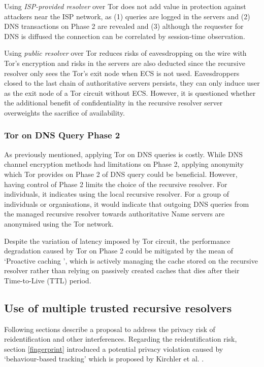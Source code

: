 Using \textit{ISP-provided resolver} over Tor does not add value in protection against attackers near the ISP network, as (1) queries are logged in the servers and (2) DNS transactions on Phase 2 are revealed and (3) although the requester for DNS is diffused the connection can be correlated by session-time observation.

Using \textit{public resolver} over Tor reduces risks of eavesdropping on the wire with Tor's encryption and risks in the servers are also deducted since the recursive resolver only sees the Tor's exit node when ECS is not used.
Eavesdroppers closed to the last chain of authoritative servers persists, they can only induce user as the exit node of a Tor circuit without ECS.
However, it is questioned whether the additional benefit of confidentiality in the recursive resolver server overweights the sacrifice of availability.

\subsubsection{Tor on DNS Query Phase 2}
As previously mentioned, applying Tor on DNS queries is costly.
While DNS channel encryption methods had limitations on Phase 2, applying anonymity which Tor provides on Phase 2 of DNS query could be beneficial.
However, having control of Phase 2 limits the choice of the recursive resolver.
For individuals, it indicates using the local recursive resolver.
For a group of individuals or organisations, it would indicate that outgoing DNS queries from the managed recursive resolver towards authoritative Name servers are anonymised using the Tor network.

Despite the variation of latency imposed by Tor circuit, the performance degradation caused by Tor on Phase 2 could be mitigated by the mean of `Proactive caching \cite{cohen2003proactive}', which is actively managing the cache stored on the recursive resolver rather than relying on passively created caches that dies after their Time-to-Live (TTL) period.

\subsection{Use of multiple trusted recursive resolvers}
Following sections describe a proposal to address the privacy risk of reidentification and other interferences.
Regarding the reidentification risk, section \ref{fingerprint} introduced a potential privacy violation caused by `behaviour-based tracking' which is proposed by Kirchler et al. \cite{kirchler2016tracked}.

